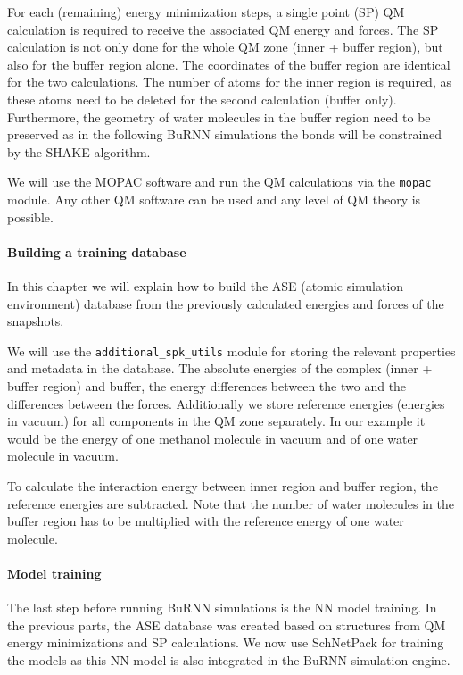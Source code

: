 For each (remaining) energy minimization steps, a single point (SP) QM calculation is required to receive the associated QM energy and forces. The SP calculation is not only done for the whole QM zone (inner + buffer region), but also for the buffer region alone. The coordinates of the buffer region are identical for the two calculations. The number of atoms for the inner region is required, as these atoms need to be deleted for the second calculation (buffer only). Furthermore, the geometry of water molecules in the buffer region need to be preserved as in the following BuRNN simulations the bonds will be constrained by the SHAKE algorithm\cite{RYCKAERT1977SHAKE}.

We will use the MOPAC software and run the QM calculations via the \texttt{mopac} module. Any other QM software can be used and any level of QM theory is possible.

\paragraph{Building a training database}
In this chapter we will explain how to build the ASE (atomic simulation environment) \cite{Larsen2017ASE} database from the previously calculated energies and forces of the snapshots. 

We will use the \texttt{additional\_spk\_utils} module for storing the relevant properties and metadata in the database. The absolute energies of the complex (inner + buffer region) and buffer, the energy differences between the two and the differences between the forces. Additionally we store reference energies (energies in vacuum) for all components in the QM zone separately. In our example it would be the energy of one methanol molecule in vacuum and of one water molecule in vacuum. 

To calculate the interaction energy between inner region and buffer region, the reference energies are subtracted. Note that the number of water molecules in the buffer region has to be multiplied with the reference energy of one water molecule.


\paragraph{Model training}
The last step before running BuRNN simulations is the NN model training. In the previous parts, the ASE database was created based on structures from QM energy minimizations and SP calculations. We now use SchNetPack for training the models as this NN model is also integrated in the BuRNN simulation engine.  

